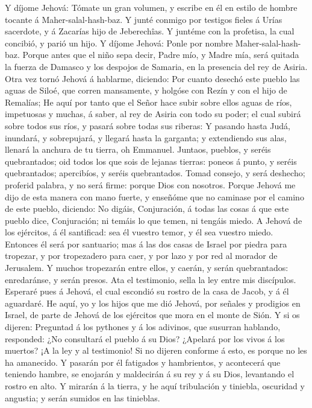  Y díjome Jehová: Tómate un gran volumen, y escribe en él en
estilo de hombre tocante á Maher-salal-hash-baz.  Y junté
conmigo por testigos fieles á Urías sacerdote, y á Zacarías hijo de
Jeberechîas.  Y juntéme con la profetisa, la cual concibió,
y parió un hijo. Y díjome Jehová: Ponle por nombre Maher-salal-hash-baz.
 Porque antes que el niño sepa decir, Padre mío, y Madre
mía, será quitada la fuerza de Damasco y los despojos de Samaria, en la
presencia del rey de Asiria.  Otra vez tornó Jehová á
hablarme, diciendo:  Por cuanto desechó este pueblo las
aguas de Siloé, que corren mansamente, y holgóse con Rezín y con el hijo
de Remalías;  He aquí por tanto que el Señor hace subir
sobre ellos aguas de ríos, impetuosas y muchas, á saber, al rey de
Asiria con todo su poder; el cual subirá sobre todos sus ríos, y pasará
sobre todas sus riberas:  Y pasando hasta Judá, inundará, y
sobrepujará, y llegará hasta la garganta; y extendiendo sus alas,
llenará la anchura de tu tierra, oh Emmanuel.  Juntaos,
pueblos, y seréis quebrantados; oid todos los que sois de lejanas
tierras: poneos á punto, y seréis quebrantados; apercibíos, y seréis
quebrantados.  Tomad consejo, y será deshecho; proferid
palabra, y no será firme: porque Dios con nosotros.  Porque
Jehová me dijo de esta manera con mano fuerte, y enseñóme que no
caminase por el camino de este pueblo, diciendo:  No
digáis, Conjuración, á todas las cosas á que este pueblo dice,
Conjuración; ni temáis lo que temen, ni tengáis miedo.  A
Jehová de los ejércitos, á él santificad: sea él vuestro temor, y él sea
vuestro miedo.  Entonces él será por santuario; mas á las
dos casas de Israel por piedra para tropezar, y por tropezadero para
caer, y por lazo y por red al morador de Jerusalem.  Y
muchos tropezarán entre ellos, y caerán, y serán quebrantados:
enredaránse, y serán presos.  Ata el testimonio, sella la
ley entre mis discípulos.  Esperaré pues á Jehová, el cual
escondió su rostro de la casa de Jacob, y á él aguardaré. 
He aquí, yo y los hijos que me dió Jehová, por señales y prodigios en
Israel, de parte de Jehová de los ejércitos que mora en el monte de
Sión.  Y si os dijeren: Preguntad á los pythones y á los
adivinos, que susurran hablando, responded: ¿No consultará el pueblo á
su Dios? ¿Apelará por los vivos á los muertos?  ¡A la ley y
al testimonio! Si no dijeren conforme á esto, es porque no les ha
amanecido.  Y pasarán por él fatigados y hambrientos, y
acontecerá que teniendo hambre, se enojarán y maldecirán á su rey y á su
Dios, levantando el rostro en alto.  Y mirarán á la tierra,
y he aquí tribulación y tiniebla, oscuridad y angustia; y serán sumidos
en las tinieblas.

